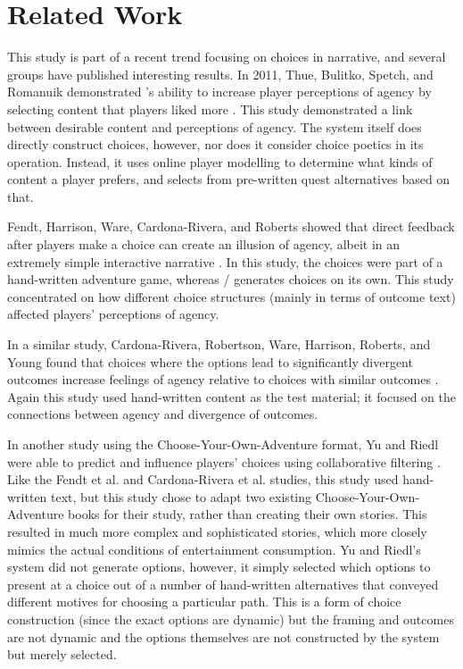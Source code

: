 \section{Related Work}

This study is part of a recent trend focusing on choices in narrative, and several groups have published interesting results.
%
In 2011, Thue, Bulitko, Spetch, and Romanuik demonstrated 's ability to increase player perceptions of agency by selecting content that players liked more \citep{Thue2011}.
%
This study demonstrated a link between desirable content and perceptions of agency.
%
The  system itself does directly construct choices, however, nor does it consider choice poetics in its operation.
Instead, it uses online player modelling to determine what kinds of content a player prefers, and selects from pre-written quest alternatives based on that.


Fendt, Harrison, Ware, Cardona-Rivera, and Roberts showed that direct feedback after players make a choice can create an illusion of agency, albeit in an extremely simple interactive narrative \citep{Fendt2012}.
%
In this study, the choices were part of a hand-written adventure game, whereas \dunyazad/ generates choices on its own.
%
This study concentrated on how different choice structures (mainly in terms of outcome text) affected players' perceptions of agency.


In a similar study, Cardona-Rivera, Robertson, Ware, Harrison, Roberts, and Young found that choices where the options lead to significantly divergent outcomes increase feelings of agency relative to choices with similar outcomes \citep{Cardona-Rivera2014}.
%
Again this study used hand-written content as the test material; it focused on the connections between agency and divergence of outcomes.


In another study using the Choose-Your-Own-Adventure format, Yu and Riedl were able to predict and influence players' choices using collaborative filtering \citep{Yu2013}.
%
Like the Fendt et al. and Cardona-Rivera et al. studies, this study used hand-written text, but this study chose to adapt two existing Choose-Your-Own-Adventure books for their study, rather than creating their own stories.
%
This resulted in much more complex and sophisticated stories, which more closely mimics the actual conditions of entertainment consumption.
%
Yu and Riedl's system did not generate options, however, it simply selected which options to present at a choice out of a number of hand-written alternatives that conveyed different motives for choosing a particular path.
%
This is a form of choice construction (since the exact options are dynamic) but the framing and outcomes are not dynamic and the options themselves are not constructed by the system but merely selected.

